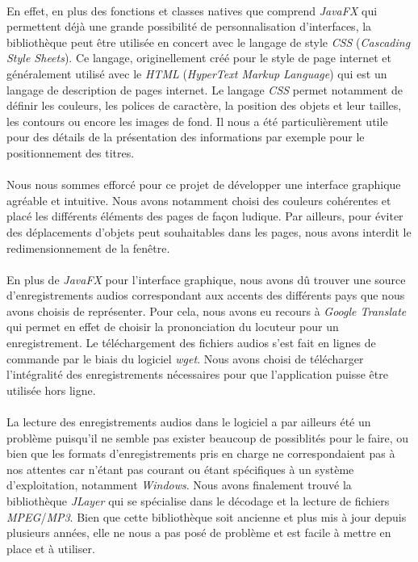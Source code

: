 \documentclass[11pt, a4paper]{report}
\begin{document}
\paragraph{}En effet, en plus des fonctions et classes natives que comprend \textit{JavaFX} qui permettent déjà une grande possibilité de personnalisation d'interfaces, la bibliothèque peut être utilisée en concert avec le langage de style \textit{CSS} (\textit{Cascading Style Sheets}). Ce langage, originellement créé pour le style de page internet et généralement utilisé avec le \textit{HTML} (\textit{HyperText Markup Language}) qui est un langage de description de pages internet. Le langage \textit{CSS} permet notamment de définir les couleurs, les polices de caractère, la position des objets et leur tailles, les contours ou encore les images de fond. Il nous a été particulièrement utile pour des détails de la présentation des informations par exemple pour le positionnement des titres.

\paragraph{}Nous nous sommes efforcé pour ce projet de développer une interface graphique agréable et intuitive. Nous avons notamment choisi des couleurs cohérentes et placé les différents éléments des pages de façon ludique. Par ailleurs, pour éviter des déplacements d'objets peut souhaitables dans les pages, nous avons interdit le redimensionnement de la fenêtre.

\paragraph{}En plus de \textit{JavaFX} pour l'interface graphique, nous avons dû trouver une source d'enregistrements audios correspondant aux accents des différents pays que nous avons choisis de représenter. Pour cela, nous avons eu recours à \textit{Google Translate} qui permet en effet de choisir la prononciation du locuteur pour un enregistrement. Le téléchargement des fichiers audios s'est fait en lignes de commande par le biais du logiciel \textit{wget}. Nous avons choisi de télécharger l'intégralité des enregistrements nécessaires pour que l'application puisse être utilisée hors ligne.

\paragraph{}La lecture des enregistrements audios dans le logiciel a par ailleurs été un problème puisqu'il ne semble pas exister beaucoup de possiblités pour le faire, ou bien que les formats d'enregistrements pris en charge ne correspondaient pas à nos attentes car n'étant pas courant ou étant spécifiques à un système d'exploitation, notamment \textit{Windows}. Nous avons finalement trouvé la bibliothèque \textit{JLayer} qui se spécialise dans le décodage et la lecture de fichiers \textit{MPEG}/\textit{MP3}. Bien que cette bibliothèque soit ancienne et plus mis à jour depuis plusieurs années, elle ne nous a pas posé de problème et est facile à mettre en place et à utiliser.
\end{document}
